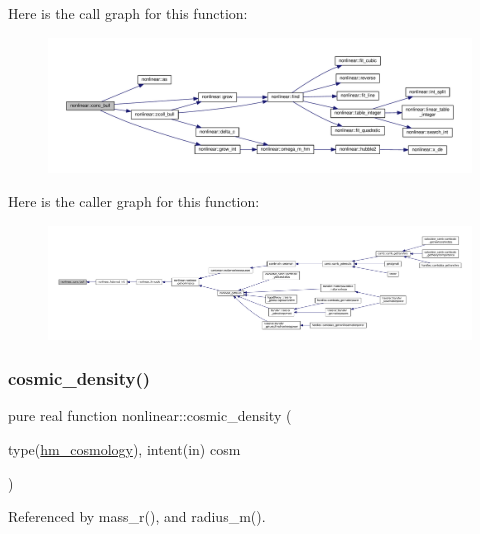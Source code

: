 Here is the call graph for this function\+:
\nopagebreak
\begin{figure}[H]
\begin{center}
\leavevmode
\includegraphics[width=350pt]{namespacenonlinear_a9559196d503174393cf74ce857984216_cgraph}
\end{center}
\end{figure}
Here is the caller graph for this function\+:
\nopagebreak
\begin{figure}[H]
\begin{center}
\leavevmode
\includegraphics[width=350pt]{namespacenonlinear_a9559196d503174393cf74ce857984216_icgraph}
\end{center}
\end{figure}
\mbox{\label{namespacenonlinear_a8d293985858b08d5e5c5bbdcdc9d4280}} 
\subsubsection{\texorpdfstring{cosmic\+\_\+density()}{cosmic\_density()}}
{\footnotesize\ttfamily pure real function nonlinear\+::cosmic\+\_\+density (\begin{DoxyParamCaption}\item[{type(\mbox{\hyperlink{structnonlinear_1_1hm__cosmology}{hm\+\_\+cosmology}}), intent(in)}]{cosm }\end{DoxyParamCaption})\hspace{0.3cm}{\ttfamily [private]}}



Referenced by mass\+\_\+r(), and radius\+\_\+m().

